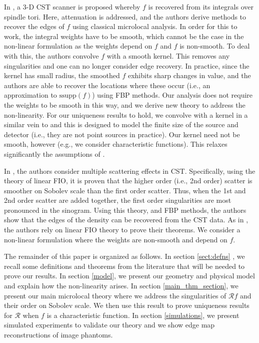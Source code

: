 \documentclass[a4paper,12pt]{amsart}
\numberwithin{equation}{section}
\theoremstyle{plain}
\numberwithin{theorem}{section}
\theoremstyle{definition}
\theoremstyle{remark}
\theoremstyle{remark}
\theoremstyle{remark}
\begin{document}
In \cite{rigaud20183d}, a 3-D CST scanner is proposed whereby $f$ is recovered from its integrals over spindle tori. Here, attenuation is addressed, and the authors derive methods to recover the edges of $f$ using classical microlocal analysis. In order for this to work, the integral weights have to be smooth, which cannot be the case in the non-linear formulation as the weights depend on $f$ and $f$ is non-smooth. To deal with this, the authors convolve $f$ with a smooth kernel. This removes any singularities and one can no longer consider edge recovery. In practice, since the kernel has small radius, the smoothed $f$ exhibits sharp changes in value, and the authors are able to recover the locations where these occur (i.e., an approximation to $\text{ssupp}(f)$) using FBP methods. Our analysis does not require the weights to be smooth in this way, and we derive new theory to address the non-linearity. For our uniqueness results to hold, we convolve with a kernel in a similar vein to \cite{rigaud20183d} and this is designed to model the finite size of the source and detector (i.e., they are not point sources in practice). Our kernel need not be smooth, however (e.g., we consider characteristic functions). This relaxes significantly the assumptions of \cite{rigaud20183d}.

In \cite{rigaud20213d}, the authors consider multiple scattering effects in CST. Specifically, using the theory of linear FIO, it is proven that the higher order (i.e., 2nd order) scatter is smoother on Sobolev scale than the first order scatter. Thus, when the 1st and 2nd order scatter are added together, the first order singularities are most pronounced in the sinogram. Using this theory, and FBP methods, the authors show that the edges of the density can be recovered from the CST data. As in \cite{rigaud20183d}, the authors rely on linear FIO theory to prove their theorems. We consider a non-linear formulation where the weights are non-smooth and depend on $f$.

The remainder of this paper is organized as follows. In section \ref{sect:defns} , we recall some definitions and theorems from the literature that will be needed to prove our results. In section \ref{model}, we present our geometry and physical model and explain how the non-linearity arises. In section \ref{main_thm_section}, we present our main microlocal theory where we address the singularities of $\mathcal{R}f$ and their order on Sobolev scale. We then use this result to prove uniqueness results for $\mathcal{R}$ when $f$ is a characteristic function. In section \ref{simulations}, we present simulated experiments to validate our theory and we show edge map reconstructions of image phantoms. 
\end{document}
